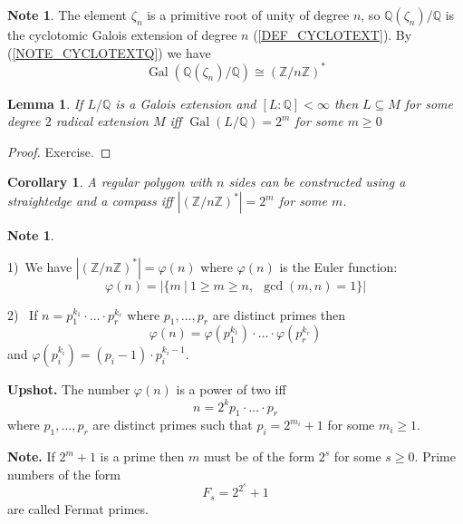 \documentclass[12pt, letterpaper, oneside]{article}
\theoremstyle{plain}
\newtheorem{lemma}[theorem]{Lemma}
\newtheorem{corollary}[theorem]{Corollary}
\theoremstyle{definition}
\newtheorem{note}[theorem]{Note}
\newcommand{\Z}{{\mathbb Z}}
\newcommand{\Q}{{\mathbb Q}}
\newcommand{\Gal}{\operatorname{Gal}}
\newcommand{\vs}{\vskip 5mm}
\begin{document}
\vs\vs

\begin{note}
The element $\zeta_{n}$ is a primitive root of unity of degree $n$, so $\Q(\zeta_{n})/\Q$
is the cyclotomic Galois extension of degree $n$ (\ref{DEF_CYCLOTEXT}).  By  
(\ref{NOTE_CYCLOTEXTQ}) we have 
$$\Gal(\Q(\zeta_{n})/\Q)\cong (\Z/n\Z)^{\ast}$$
\end{note}


\vs\vs

\begin{lemma}
If $L/\Q$ is a Galois extension and $[L:\Q] <\infty$ then $L\subseteq M$ for some 
degree $2$ radical extension $M$ iff $\Gal(L/\Q) = 2^{m}$ for some $m\geq 0$
\end{lemma}


\vs 

\begin{proof}
Exercise. 
\end{proof}


\vs\vs

\begin{corollary}
A regular polygon with $n$ sides can be constructed using a straightedge and  a compass
iff $|(\Z/n\Z)^{\ast}| = 2^{m}$ for some $m$. 
\end{corollary}



\vs\vs


\begin{note} \ 

1)\  We have $|(\Z/n\Z)^{\ast}| = \varphi(n)$  where $\varphi(n)$ is the Euler function:
$$\varphi(n) = |\{ m \ | \ 1 \geq m \geq n, \ \ \gcd(m, n) =1 \}|$$

2) \ If $n = p_{1}^{k_{1}}\cdot {\dots}\cdot p_{r}^{k_{r}}$ where $p_{1}, \dots, p_{r}$ are 
distinct primes then 
$$\varphi(n) = \varphi(p_{1}^{k_{1}})\cdot {\dots}\cdot \varphi(p_{r}^{k_{r}})$$
and $\varphi(p_{i}^{k_{i}}) = (p_{i}-1)\cdot p_{i}^{k_{i}-1}$.

\end{note}


\vs\vs

\textbf{Upshot.}  The number $\varphi(n)$ is a power of two iff 
$$n = 2^{k}p_{1}\cdot{\dots}\cdot p_{r}$$
where $p_{1}, \dots, p_{r}$ are distinct primes such that $p_{i} = 2^{m_{i}}+1$
for some $m_{i}\geq 1$. 

\vs\vs

\textbf{Note.} If $2^{m}+1$ is a prime then $m$ must be of the form $2^{s}$ for some $s\geq 0$. 
Prime numbers of the form 
$$F_{s}= 2^{2^{s}}+1$$
are called Fermat primes. 
\end{document}
